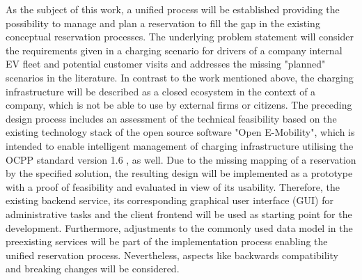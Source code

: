 \noindent As the subject of this work, a unified process will be established providing the possibility to manage and plan a reservation to fill the gap in the existing conceptual reservation processes. The underlying problem statement will consider the requirements given in a charging scenario for drivers of a company internal EV fleet and potential customer visits and addresses the missing "planned" scenarios in the literature. 
In contrast to the work mentioned above, the charging infrastructure will be described as a closed ecosystem in the context of a company, which is not be able to use by external firms or citizens.
The preceding design process includes an assessment of the technical feasibility based on the existing technology stack of the open source software "Open E-Mobility", which is intended to enable intelligent management of charging infrastructure utilising the OCPP standard version 1.6 \cite{noauthor_ocpp_nodate}, as well. Due to the missing mapping of a reservation by the specified solution, the resulting design will be implemented as a prototype with a proof of feasibility and evaluated in view of its usability. Therefore, the existing backend service, its corresponding graphical user interface (GUI) for administrative tasks and the client frontend will be used as starting point for the development. Furthermore, adjustments to the commonly used data model in the preexisting services will be part of the implementation process enabling the unified reservation process. Nevertheless, aspects like backwards compatibility and breaking changes will be considered.